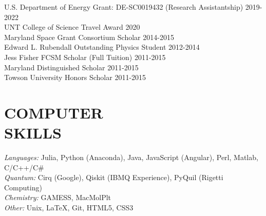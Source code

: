 \documentclass[overlapped, 10pt]{res} %
\begin{document}
\begin{resume}
U.S. Department of Energy Grant: DE-SC0019432 (Research Assistantship) \hfill 2019-2022 \\
UNT College of Science Travel Award \hfill 2020 \\
Maryland Space Grant Consortium Scholar \hfill 2014-2015 \\
Edward L. Rubendall Outstanding Physics Student \hfill 2012-2014 \\
Jess Fisher FCSM Scholar (Full Tuition) \hfill 2011-2015 \\
Maryland Distinguished Scholar \hfill 2011-2015 \\
Towson University Honors Scholar \hfill 2011-2015



\section{COMPUTER\\SKILLS}

{\sl Languages:} Julia, Python (Anaconda), Java, JavaScript (Angular), Perl, Matlab, C/C++/C\# \\
{\sl Quantum:} Cirq (Google), Qiskit (IBMQ Experience), PyQuil (Rigetti Computing) \\
{\sl Chemistry:} GAMESS, MacMolPlt \\
{\sl Other:} Unix, LaTeX, Git, HTML5, CSS3


\end{resume}
\end{document}
